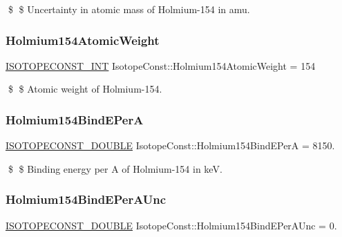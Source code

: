 \$ \$ Uncertainty in atomic mass of Holmium-\/154 in amu. \mbox{\label{group___isotope_const-_holmium-_ho154_ga52779f0148d5d401a4297b7c413d59df}} 
\subsubsection{\texorpdfstring{Holmium154\+Atomic\+Weight}{Holmium154AtomicWeight}}
{\footnotesize\ttfamily \mbox{\hyperlink{group___isotope_const-_macros_ga5f18360b3e99483a35c32d789e62621c}{I\+S\+O\+T\+O\+P\+E\+C\+O\+N\+S\+T\+\_\+\+I\+NT}} Isotope\+Const\+::\+Holmium154\+Atomic\+Weight = 154}

\$ \$ Atomic weight of Holmium-\/154. \mbox{\label{group___isotope_const-_holmium-_ho154_ga769692f4974cf1689b89526fc81def5f}} 
\subsubsection{\texorpdfstring{Holmium154\+Bind\+E\+PerA}{Holmium154BindEPerA}}
{\footnotesize\ttfamily \mbox{\hyperlink{group___isotope_const-_macros_ga8f45a7272ce02c0b4c65c44636ed719a}{I\+S\+O\+T\+O\+P\+E\+C\+O\+N\+S\+T\+\_\+\+D\+O\+U\+B\+LE}} Isotope\+Const\+::\+Holmium154\+Bind\+E\+PerA = 8150.}

\$ \$ Binding energy per A of Holmium-\/154 in keV. \mbox{\label{group___isotope_const-_holmium-_ho154_gab4ea8c54c828f2776ff84f8e90850d8f}} 
\subsubsection{\texorpdfstring{Holmium154\+Bind\+E\+Per\+A\+Unc}{Holmium154BindEPerAUnc}}
{\footnotesize\ttfamily \mbox{\hyperlink{group___isotope_const-_macros_ga8f45a7272ce02c0b4c65c44636ed719a}{I\+S\+O\+T\+O\+P\+E\+C\+O\+N\+S\+T\+\_\+\+D\+O\+U\+B\+LE}} Isotope\+Const\+::\+Holmium154\+Bind\+E\+Per\+A\+Unc = 0.}

